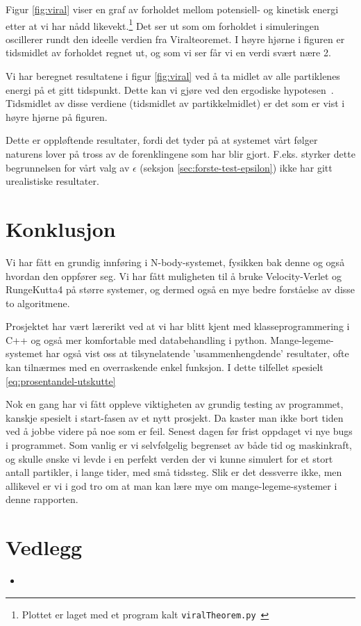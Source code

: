 \documentclass[11pt]{article}
\begin{document}
\begin{multicols*}{2}

Figur \ref{fig:viral} viser en graf av forholdet mellom potensiell- og
kinetisk energi etter at vi har nådd likevekt.\footnote{Plottet er
  laget med et program kalt
  \texttt{viralTheorem.py}~\cite{github-repo}} Det ser ut som om
forholdet i simuleringen oscillerer rundt den ideelle verdien fra
Viralteoremet. I høyre hjørne i figuren er tidsmidlet av forholdet
regnet ut, og som vi ser får vi en verdi svært nære 2. 

Vi har beregnet resultatene i figur \ref{fig:viral} ved å ta midlet av
alle partiklenes energi på et gitt tidspunkt. Dette kan vi gjøre ved
den ergodiske hypotesen~\cite{ergodisk-hypotese}. Tidsmidlet av disse
verdiene (tidsmidlet av partikkelmidlet) er det som er vist i høyre
hjørne på figuren.

Dette er oppløftende resultater, fordi det tyder på at systemet vårt følger
naturens lover på tross av de forenklingene som har blir
gjort. F.eks. styrker dette begrunnelsen for vårt valg av $\epsilon$
(seksjon \ref{sec:forste-test-epsilon}) ikke har gitt urealistiske
resultater. 


\section{Konklusjon}
Vi har fått en grundig innføring i N-body-systemet, fysikken bak denne
og også hvordan den oppfører seg. Vi har fått muligheten til å
bruke Velocity-Verlet og RungeKutta4 på større systemer, og dermed
også en mye bedre forståelse av disse to algoritmene.

Prosjektet har vært lærerikt ved at vi har blitt kjent med
klasseprogrammering i C++ og også mer komfortable med databehandling
i python. Mange-legeme-systemet har også vist oss at
tilsynelatende 'usammenhengdende' resultater, ofte kan tilnærmes
med en overraskende enkel funksjon. I dette tilfellet spesielt
\ref{eq:prosentandel-utskutte}

Nok en gang har vi fått oppleve viktigheten av grundig testing
av programmet, kanskje spesielt i start-fasen av et nytt prosjekt. Da 
kaster man ikke bort tiden ved å jobbe videre på noe som er feil. Senest
dagen før frist oppdaget vi nye bugs i programmet. Som vanlig er vi
selvfølgelig begrenset av både tid og maskinkraft, og skulle ønske vi 
levde i en perfekt verden der vi kunne simulert for et stort antall partikler,
i lange tider, med små tidssteg. Slik er det dessverre ikke, 
men allikevel er vi i god tro om at man kan lære mye om mange-legeme-systemer
i denne rapporten.







\end{multicols*}
\clearpage
\printbibliography
\clearpage
\section{Vedlegg}
\begin{itemize}
  \item[]
\end{itemize}
\end{document}
